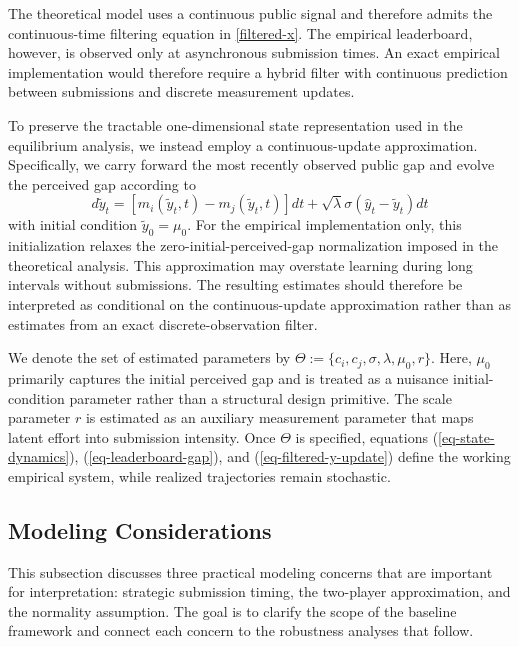 \documentclass[mnsc]{informs3}
\begin{document}
The theoretical model uses a continuous public signal and therefore admits the continuous-time filtering equation in \eqref{filtered-x}. The empirical leaderboard, however, is observed only at asynchronous submission times. An exact empirical implementation would therefore require a hybrid filter with continuous prediction between submissions and discrete measurement updates.

To preserve the tractable one-dimensional state representation used in the equilibrium analysis, we instead employ a continuous-update approximation. Specifically, we carry forward the most recently observed public gap and evolve the perceived gap according to
\begin{equation}\label{eq-filtered-y-update}
d\tilde{y}_{t} = \left[m_i(\tilde{y}_t, t) - m_j(\tilde{y}_t, t)\right]dt + \sqrt{\lambda}\sigma(\hat{y}_t-\tilde{y}_{t}) dt
\end{equation}
with initial condition $\tilde{y}_0 = \mu_0$.
For the empirical implementation only, this initialization relaxes the zero-initial-perceived-gap normalization imposed in the theoretical analysis.
This approximation may overstate learning during long intervals without submissions. The resulting estimates should therefore be interpreted as conditional on the continuous-update approximation rather than as estimates from an exact discrete-observation filter.

We denote the set of estimated parameters by $\Theta := \{c_i, c_j, \sigma, \lambda, \mu_0,r\}$.
Here, $\mu_0$ primarily captures the initial perceived gap and is treated as a nuisance initial-condition parameter rather than a structural design primitive.
The scale parameter $r$ is estimated as an auxiliary measurement parameter that maps latent effort into submission intensity.
Once $\Theta$ is specified, equations (\ref{eq-state-dynamics}), (\ref{eq-leaderboard-gap}), and (\ref{eq-filtered-y-update}) define the working empirical system, while realized trajectories remain stochastic.



\subsection{Modeling Considerations}\label{sect-concerns}

This subsection discusses three practical modeling concerns that are important for interpretation: strategic submission timing, the two-player approximation, and the normality assumption.
The goal is to clarify the scope of the baseline framework and connect each concern to the robustness analyses that follow.
\end{document}
